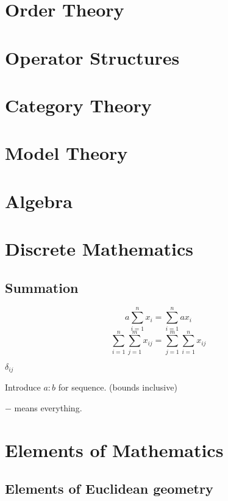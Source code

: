 \documentclass{report}
\begin{document}
\part{Order Theory}
\setcounter{chapter}{0} %


\part{Operator Structures}
\setcounter{chapter}{0} %


\part{Category Theory}
\setcounter{chapter}{0} %


\part{Model Theory}
\setcounter{chapter}{0} %


\part{Algebra}
\setcounter{chapter}{0} %


\part{Discrete Mathematics}
\setcounter{chapter}{0} %
\chapter{Summation}
\[ a\sum_{i=1}^n x_i = \sum_{i=1}^n ax_i \]
\[ \sum_{i=1}^n\sum_{j=1}^m x_{ij} = \sum_{j=1}^m\sum_{i=1}^n x_{ij} \]

$\delta_{ij}$

Introduce $a:b$ for sequence. (bounds inclusive)

$-$ means everything.



\part{Elements of Mathematics}
\setcounter{chapter}{0} %
\chapter{Elements of Euclidean geometry}

\end{document}

